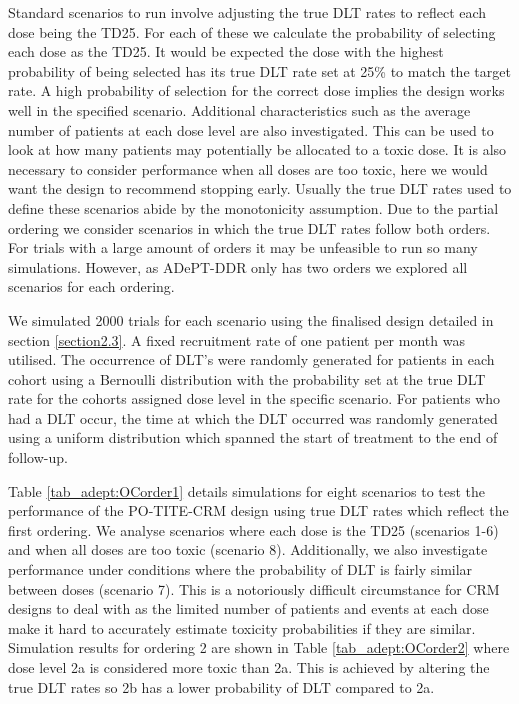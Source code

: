 Standard scenarios to run involve adjusting the true DLT rates to reflect each dose being the TD25. For each of these we calculate the probability of selecting each dose as the TD25. It would be expected the dose with the highest probability of being selected has its true DLT rate set at 25\% to match the target rate. A high probability of selection for the correct dose implies the design works well in the specified scenario. Additional characteristics such as the average number of patients at each dose level are also investigated. This can be used to look at how many patients may potentially be allocated to a toxic dose. It is also necessary to consider performance when all doses are too toxic, here we would want the design to recommend stopping early. Usually the true DLT rates used to define these scenarios abide by the monotonicity assumption. Due to the partial ordering we consider scenarios in which the true DLT rates follow both orders. For trials with a large amount of orders it may be unfeasible to run so many simulations. However, as ADePT-DDR only has two orders we explored all scenarios for each ordering.

We simulated 2000 trials for each scenario using the finalised design detailed in section \ref{section2.3}. A fixed recruitment rate of one patient per month was utilised. The occurrence of DLT's were randomly generated for patients in each cohort using a Bernoulli distribution with the probability set at the true DLT rate for the cohorts assigned dose level in the specific scenario. For patients who had a DLT occur, the time at which the DLT occurred was randomly generated using a uniform distribution which spanned the start of treatment to the end of follow-up.  

Table \ref{tab_adept:OCorder1} details simulations for eight scenarios to test the performance of the PO-TITE-CRM design using true DLT rates which reflect the first ordering. We analyse scenarios where each dose is the TD25 (scenarios 1-6) and when all doses are too toxic (scenario 8). Additionally, we also investigate performance under conditions where the probability of DLT is fairly similar between doses (scenario 7). This is a notoriously difficult circumstance for CRM designs to deal with as the limited number of patients and events at each dose make it hard to accurately estimate toxicity probabilities if they are similar. Simulation results for ordering 2 are shown in Table \ref{tab_adept:OCorder2} where dose level 2a is considered more toxic than 2a. This is achieved by altering the true DLT rates so 2b has a lower probability of DLT compared to 2a. 

